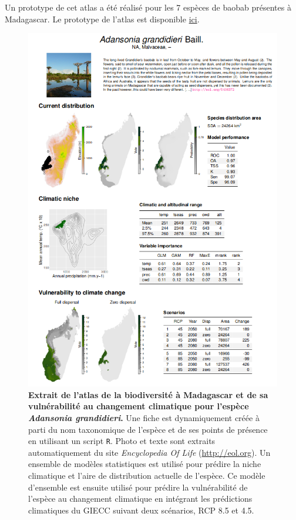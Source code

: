 \documentclass[12pt,]{article}
\begin{document}
Un prototype de cet atlas a été réalisé pour les 7 espèces de baobab
présentes à Madagascar. Le prototype de l'atlas est disponible
\href{https://bioscenemada.cirad.fr/FileTransfer/atlas.pdf}{ici}.













\begin{figure}[H]

{\centering \includegraphics[width=0.8\linewidth]{figures/atlas} 

}

\caption{\textbf{Extrait de l'atlas de la biodiversité à
Madagascar et de sa vulnérabilité au changement climatique pour l'espèce
\emph{Adansonia grandidieri}.} Une fiche est dynamiquement créée à parti
du nom taxonomique de l'espèce et de ses points de présence en utilisant
un script \texttt{R}. Photo et texte sont extraits automatiquement du
site \emph{Encyclopedia Of Life} (\url{http://eol.org}). Un ensemble de
modèles statistiques est utilisé pour prédire la niche climatique et
l'aire de distribution actuelle de l'espèce. Ce modèle d'ensemble est
ensuite utilisé pour prédire la vulnérabilité de l'espèce au changement
climatique en intégrant les prédictions climatiques du GIECC suivant
deux scénarios, RCP 8.5 et 4.5.}\label{fig:atlas}
\end{figure}
\end{document}
